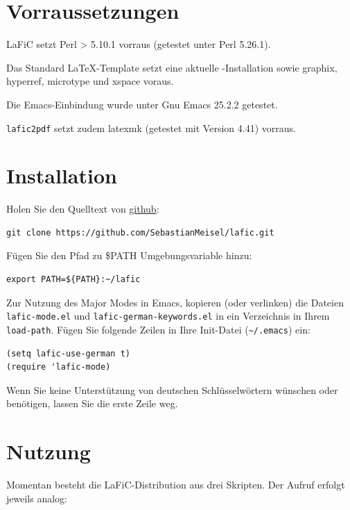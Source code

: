 \documentclass{scrartcl}
\begin{document}
\section{Vorraussetzungen}

LaFiC setzt Perl > 5.10.1 vorraus (getestet unter Perl 5.26.1).

Das Standard \LaTeX-Template setzt eine aktuelle
\XeLaTeX-Installation sowie graphix, hyperref, microtype und
xspace voraus.

Die Emacs-Einbindung wurde unter Gnu Emacs 25.2.2 getestet.

\texttt{lafic2pdf} setzt zudem latexmk (getestet mit Version 4.41) vorraus.

\section{Installation}

Holen Sie den Quelltext von \href{https://github.com}{github}:

\begin{verbatim}
git clone https://github.com/SebastianMeisel/lafic.git

\end{verbatim}

Fügen Sie den Pfad zu \$PATH Umgebungsvariable hinzu:

\begin{verbatim}
export PATH=${PATH}:~/lafic

\end{verbatim}

Zur Nutzung des Major Modes in Emacs, kopieren (oder
verlinken) die Dateien \texttt{lafic-mode.el} und
\texttt{lafic-german-keywords.el} in ein Verzeichnis in Ihrem
\texttt{load-path}. Fügen Sie folgende Zeilen in Ihre Init-Datei
(\texttt{\textasciitilde /.emacs}) ein:

\begin{verbatim}
(setq lafic-use-german t)
(require 'lafic-mode)

\end{verbatim}

Wenn Sie keine Unterstützung von deutschen Schlüsselwörtern
wünschen oder benötigen, lassen Sie die erste Zeile weg.

\section{Nutzung}

Momentan besteht die LaFiC-Distribution aus drei
Skripten. Der Aufruf erfolgt jeweils analog:
\end{document}
